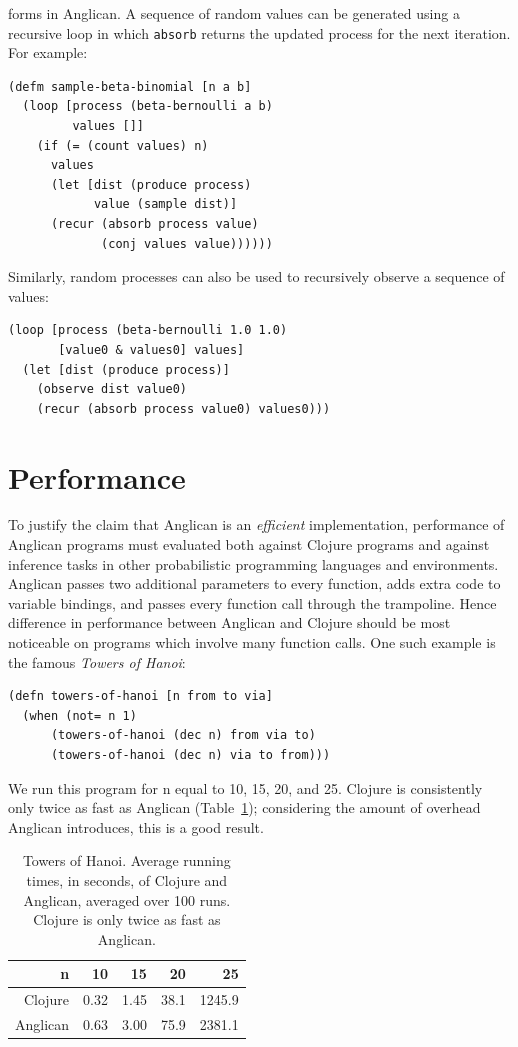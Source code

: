 \documentclass[preprint]{sigplanconf}
\begin{document}
forms in Anglican. A sequence of random values can be generated
using a recursive loop in which \texttt{absorb} returns the
updated process for the next iteration. For example:
\begin{lstlisting}[style=default]
(defm sample-beta-binomial [n a b]
  (loop [process (beta-bernoulli a b)
         values []]
    (if (= (count values) n)
      values
      (let [dist (produce process)
            value (sample dist)]
      (recur (absorb process value)
             (conj values value))))))
\end{lstlisting}
Similarly, random processes can also be used to recursively
observe a sequence of values:
\begin{lstlisting}[style=default]
(loop [process (beta-bernoulli 1.0 1.0)
       [value0 & values0] values] 
  (let [dist (produce process)]
    (observe dist value0)
    (recur (absorb process value0) values0)))
\end{lstlisting}

\section{Performance}

To justify the claim that Anglican is an \textit{efficient}
implementation, performance of Anglican programs must evaluated
both against Clojure programs and against inference tasks in
other probabilistic programming languages and environments.
Anglican passes two additional parameters to every function, adds
extra code to variable bindings, and passes every function
call through the trampoline. Hence difference in performance
between Anglican and Clojure should be most noticeable on
programs which involve many function calls. One such example is
the famous \textit{Towers of Hanoi}:

\begin{lstlisting}[style=default]
(defn towers-of-hanoi [n from to via]
  (when (not= n 1)
      (towers-of-hanoi (dec n) from via to)
      (towers-of-hanoi (dec n) via to from)))
\end{lstlisting}

We run this program for n equal to 10, 15, 20, and 25. Clojure
is consistently only twice as fast as Anglican
(Table~\ref{tbl:hanoi}); considering the amount of overhead
Anglican introduces, this is a good result.
\begin{table}
    \centering
    \begin{tabular}{r|r|r|r|r}
        {\bf n}  & {\bf 10} & {\bf 15} & {\bf 20} &{\bf 25} \\ \hline
        Clojure &  0.32 & 1.45 & 38.1  &  1245.9 \\ \hline
        Anglican & 0.63 & 3.00 & 75.9 & 2381.1 
    \end{tabular}
    \caption{Towers of Hanoi. Average running times, in
    seconds, of Clojure and Anglican, averaged over 100 runs.
    Clojure is only twice as fast as Anglican.}
    \label{tbl:hanoi}
\end{table}
\end{document}
